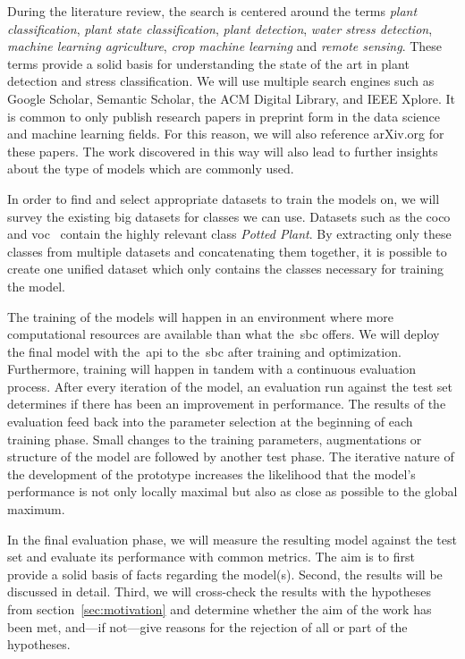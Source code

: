 \documentclass[draft,final]{vutinfth} %
\begin{document}
During the literature review, the search is centered around the terms
\emph{plant classification}, \emph{plant state classification},
\emph{plant detection}, \emph{water stress detection}, \emph{machine
learning agriculture}, \emph{crop machine learning} and \emph{remote
sensing}. These terms provide a solid basis for understanding the
state of the art in plant detection and stress classification. We will
use multiple search engines such as Google Scholar, Semantic Scholar,
the ACM Digital Library, and IEEE Xplore. It is common to only publish
research papers in preprint form in the data science and machine
learning fields. For this reason, we will also reference arXiv.org for
these papers. The work discovered in this way will also lead to
further insights about the type of models which are commonly used.

In order to find and select appropriate datasets to train the models
on, we will survey the existing big datasets for classes we can
use. Datasets such as the \gls{coco}~\cite{lin2015} and
\gls{voc}~\cite{everingham2010} contain the highly relevant class
\emph{Potted Plant}. By extracting only these classes from multiple
datasets and concatenating them together, it is possible to create one
unified dataset which only contains the classes necessary for training
the model.

The training of the models will happen in an environment where more
computational resources are available than what the~\gls{sbc}
offers. We will deploy the final model with the~\gls{api} to
the~\gls{sbc} after training and optimization. Furthermore, training
will happen in tandem with a continuous evaluation process. After
every iteration of the model, an evaluation run against the test set
determines if there has been an improvement in performance. The
results of the evaluation feed back into the parameter selection at
the beginning of each training phase. Small changes to the training
parameters, augmentations or structure of the model are followed by
another test phase. The iterative nature of the development of the
prototype increases the likelihood that the model's performance is not
only locally maximal but also as close as possible to the global
maximum.

In the final evaluation phase, we will measure the resulting model
against the test set and evaluate its performance with common
metrics. The aim is to first provide a solid basis of facts regarding
the model(s). Second, the results will be discussed in detail. Third,
we will cross-check the results with the hypotheses from
section~\ref{sec:motivation} and determine whether the aim of the work
has been met, and—if not—give reasons for the rejection of all or part
of the hypotheses.
\end{document}
